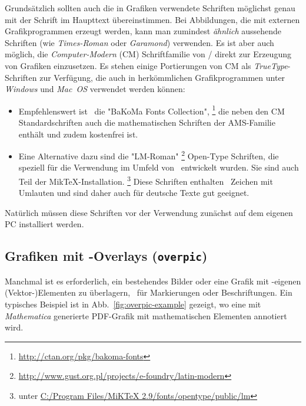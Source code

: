Grundsätzlich sollten auch die in Grafiken verwendete Schriften möglichst genau
mit der Schrift im Haupttext übereinstimmen. Bei Abbildungen, die mit externen
Grafikprogrammen erzeugt werden, kann man
zumindest \emph{ähnlich} aussehende Schriften (wie \emph{Times-Roman} oder
\emph{Garamond}) verwenden. Es ist aber auch möglich, die 
\emph{Computer-Modern} (CM) Schriftfamilie von {\tex}/{\latex} direkt
zur Erzeugung von Grafiken einzusetzen.
Es stehen einige Portierungen von CM als \emph{TrueType}-Schriften zur
Verfügung, die auch in herkömmlichen Grafikprogrammen unter \emph{Windows}
und \emph{Mac~OS} verwendet werden können:
%
\begin{itemize}
\item	%
Empfehlenswert ist \zB\ die "BaKoMa Fonts Collection",%
\footnote{\url{http://ctan.org/pkg/bakoma-fonts}}
die neben den CM Standardschriften auch die mathematischen Schriften der
AMS-Familie ent\-hält und zudem kostenfrei ist. 
\item	%
Eine Alternative dazu sind die "LM-Roman"%
\footnote{\url{http://www.gust.org.pl/projects/e-foundry/latin-modern}}
Open-Type Schriften, die speziell für die Verwendung im Umfeld von \latex\
entwickelt wurden. Sie sind auch Teil der MikTeX-Installation.%
\footnote{\zB unter \url{C:/Program Files/MiKTeX 2.9/fonts/opentype/public/lm}}
Diese Schriften enthalten \ua\ Zeichen mit Umlauten und sind daher auch für 
deutsche Texte gut geeignet.
\end{itemize}
%
Natürlich müssen diese Schriften vor der Verwendung zunächst auf dem eigenen PC
installiert werden.

\subsection{Grafiken mit \latex-Overlays (\texttt{overpic})}
\label{sec:GraphicOverlays}

Manchmal ist es erforderlich, ein bestehendes Bilder oder eine Grafik mit
\latex-eigenen (Vektor-){\obnh}Elementen zu überlagern, \zB\ für Markierungen oder
Beschriftungen. Ein typisches Beispiel ist in Abb.~\ref{fig:overpic-example}
gezeigt, wo eine mit \emph{Mathematica} generierte PDF-Grafik mit
mathematischen Elementen annotiert wird.

